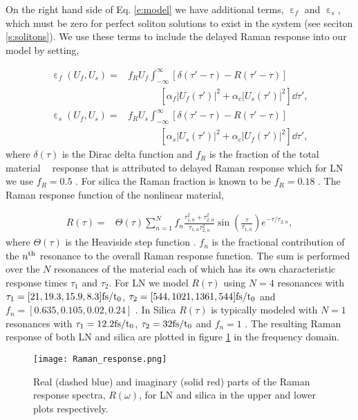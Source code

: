 \documentclass[reprint,
 amsmath,amssymb,
 pra,
]{revtex4-1}
\newcommand{\eq}[1]{
\begin{equation}\begin{aligned}
#1
\end{aligned}\end{equation}}
\DeclareMathOperator{\chithree}{ {\chi}^{(3)} }
\DeclareMathOperator{\eps}{\varepsilon}
\begin{document}
On the right hand side of Eq. \eqref{e:model} we have additional terms, $\eps_f$ and $\eps_s$, which must be zero for perfect soliton solutions to exist in the system (see seciton \ref{s:solitons}). We use these terms to include the delayed Raman response into our model by setting,
\eq{
\eps_f(U_f,U_s) = &  f_R U_f  \int_{-\infty}^{\infty} [ \delta(\tau' -\tau) - R(\tau' -\tau)  ]\\
&\,\,\,\,\,\,\,\,\,\,\,\,\,\,\,\,\,\,\,\, [\alpha_f |U_f(\tau')|^2 + \alpha_c |U_s(\tau')|^2] \dd \tau' ,\\
\eps_s(U_f,U_s) = &  f_R U_s  \int_{-\infty}^{\infty} [ \delta(\tau' -\tau) - R(\tau'-\tau)] \\
&\,\,\,\,\,\,\,\,\,\,\,\,\,\,\,\,\,\,\,\, [\alpha_s |U_s(\tau')|^2 + \alpha_c |U_f(\tau')|^2] \dd \tau' ,
}
where $\delta(\tau)$ is the Dirac delta function and $f_R$ is the fraction of the total material $\chithree$ response that is attributed to delayed Raman response which for LN we use $f_R =  0.5$ \cite{Bache2012ReviewResponse, Guo2013NonlinearMedia}. For silica the Raman fraction is known to be $f_R=0.18$ \cite{Skryabin2010TheoryWaves}. The Raman response function of the nonlinear material,
\eq{
R(\tau) =& \Theta(\tau) \sum_{n=1}^N f_n  \frac{\tau_{1,n}^2 + \tau_{2,n}^2}{\tau_{1,n}\tau_{2,n}^2} \sin( \frac{\tau}{\tau_{1,n}}) e^{-\tau/\tau_{2,n}},
}
where $\Theta(\tau)$ is the Heaviside step function \cite{Gorbach2008SolitonFibers}.
$f_n$ is the fractional contribution of the $n^{\rm{th}}$ resonance to the overall Raman response function. The sum is performed over the $N$ resonances of the material each of which has its own characteristic response times $\tau_1$ and $\tau_2$.
For LN we model $R(\tau)$ using $N=4$ resonances with $\tau_1 = [21, 19.3, 15.9, 8.3]\rm{fs}/t_0$, $\tau_2 = [544, 1021, 1361, 544]\rm{fs}/t_0$ and $f_n = [0.635, 0.105, 0.02, 0.24]$ \cite{Bache2012ReviewResponse}. In Silica $R(\tau)$ is typically modeled with $N=1$ resonances with $\tau_1 = 12.2\rm{fs}/t_0$, $\tau_2 = 32\rm{fs}/t_0$ and $f_n = 1$ \cite{Gorbach2007TheoryFibers}. The resulting Raman response of both LN and silica are plotted in figure \ref{fig:Raman_response} in the frequency domain.


\begin{figure}[b]
    \centering
    \texttt{[image: Raman\_response.png]}
    \caption{ Real (dashed blue) and imaginary (solid red) parts of the Raman response spectra, $R(\omega)$, for LN and silica in the upper and lower plots respectively.  }
    \label{fig:Raman_response}
\end{figure}
\end{document}
